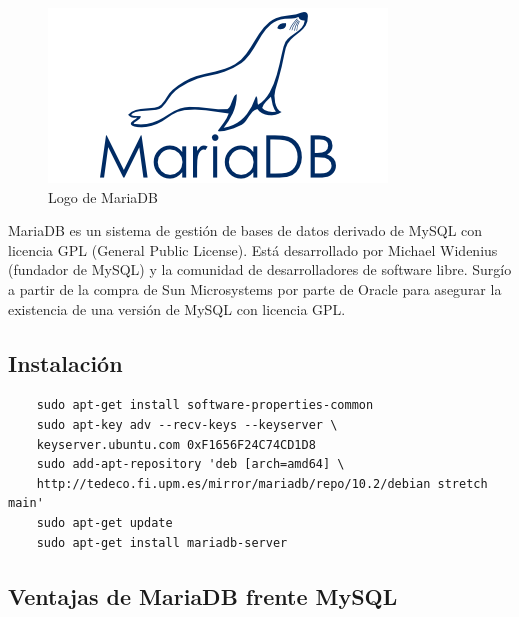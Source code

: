 \documentclass[openright,twoside,10pt]{book}
\begin{document}
    \begin{figure}[H]
        \begin{center}
            \includegraphics[scale=0.75]{img/mariadb.png}
        \end{center}
        \caption{Logo de MariaDB}
    \end{figure}
    
    MariaDB es un sistema de gestión de bases de datos derivado de MySQL con
    licencia GPL (General Public License). Está desarrollado por Michael
    Widenius (fundador de MySQL) y la comunidad de desarrolladores de
    software libre. Surgío a partir de la compra de Sun Microsystems por
    parte de Oracle para asegurar la existencia de una versión de MySQL con
    licencia GPL.
    
    \subsection{Instalación}\label{instalaciuxf3n-4}
    
    \begin{verbatim}
    sudo apt-get install software-properties-common
    sudo apt-key adv --recv-keys --keyserver \
    keyserver.ubuntu.com 0xF1656F24C74CD1D8
    sudo add-apt-repository 'deb [arch=amd64] \
    http://tedeco.fi.upm.es/mirror/mariadb/repo/10.2/debian stretch main'
    sudo apt-get update
    sudo apt-get install mariadb-server
    \end{verbatim}
    
    \subsection{Ventajas de MariaDB frente
    MySQL}\label{ventajas-de-mariadb-frente-mysql}
    
\end{document}
